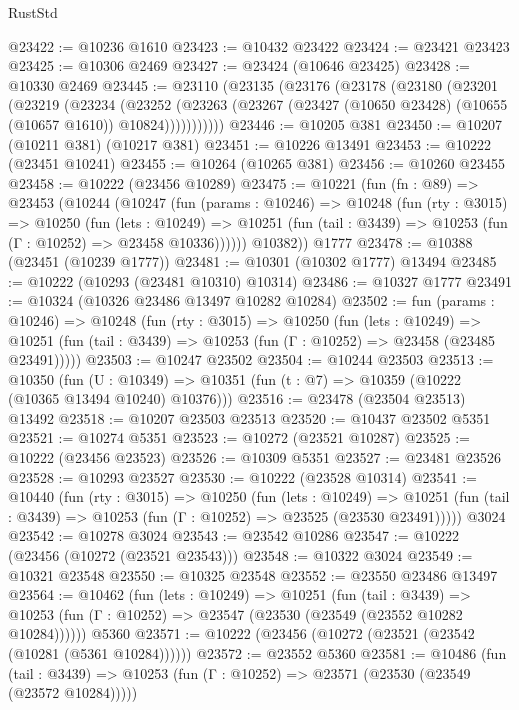 \begin{lexlean}{RustStd}
\begin{coremodule}
@23422 := @10236 @1610
@23423 := @10432 @23422
@23424 := @23421 @23423
@23425 := @10306 @2469
@23427 := @23424 (@10646 @23425)
@23428 := @10330 @2469
@23445 := @23110
    (@23135
      (@23176
        (@23178
          (@23180
            (@23201
              (@23219
                (@23234
                  (@23252
                    (@23263
                      (@23267 (@23427 (@10650 @23428) (@10655 (@10657 @1610)) @10824)))))))))))
@23446 := @10205 @381
@23450 := @10207 (@10211 @381) (@10217 @381)
@23451 := @10226 @13491
@23453 := @10222 (@23451 @10241)
@23455 := @10264 (@10265 @381)
@23456 := @10260 @23455
@23458 := @10222 (@23456 @10289)
@23475 := @10221
    (fun (fn : @89) =>
    @23453
      (@10244
        (@10247
          (fun (params : @10246) =>
          @10248
            (fun (rty : @3015) =>
            @10250
              (fun (lets : @10249) =>
              @10251 (fun (tail : @3439) => @10253 (fun (Γ : @10252) => @23458 @10336))))))
        @10382))
    @1777
@23478 := @10388 (@23451 (@10239 @1777))
@23481 := @10301 (@10302 @1777) @13494
@23485 := @10222 (@10293 (@23481 @10310) @10314)
@23486 := @10327 @1777
@23491 := @10324 (@10326 @23486 @13497 @10282 @10284)
@23502 := fun (params : @10246) =>
  @10248
    (fun (rty : @3015) =>
    @10250
      (fun (lets : @10249) =>
      @10251 (fun (tail : @3439) => @10253 (fun (Γ : @10252) => @23458 (@23485 @23491)))))
@23503 := @10247 @23502
@23504 := @10244 @23503
@23513 := @10350
    (fun (U : @10349) => @10351 (fun (t : @7) => @10359 (@10222 (@10365 @13494 @10240) @10376)))
@23516 := @23478 (@23504 @23513) @13492
@23518 := @10207 @23503 @23513
@23520 := @10437 @23502 @5351
@23521 := @10274 @5351
@23523 := @10272 (@23521 @10287)
@23525 := @10222 (@23456 @23523)
@23526 := @10309 @5351
@23527 := @23481 @23526
@23528 := @10293 @23527
@23530 := @10222 (@23528 @10314)
@23541 := @10440
    (fun (rty : @3015) =>
    @10250
      (fun (lets : @10249) =>
      @10251 (fun (tail : @3439) => @10253 (fun (Γ : @10252) => @23525 (@23530 @23491)))))
    @3024
@23542 := @10278 @3024
@23543 := @23542 @10286
@23547 := @10222 (@23456 (@10272 (@23521 @23543)))
@23548 := @10322 @3024
@23549 := @10321 @23548
@23550 := @10325 @23548
@23552 := @23550 @23486 @13497
@23564 := @10462
    (fun (lets : @10249) =>
    @10251
      (fun (tail : @3439) =>
      @10253 (fun (Γ : @10252) => @23547 (@23530 (@23549 (@23552 @10282 @10284))))))
    @5360
@23571 := @10222 (@23456 (@10272 (@23521 (@23542 (@10281 (@5361 @10284))))))
@23572 := @23552 @5360
@23581 := @10486
    (fun (tail : @3439) => @10253 (fun (Γ : @10252) => @23571 (@23530 (@23549 (@23572 @10284)))))

\end{coremodule}
\end{lexlean}
